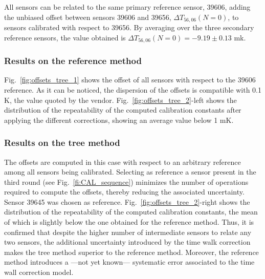 All sensors can be related to the same primary reference sensor, 39606, adding  the unbiased offset between sensors 39606 and 39656,  $\Delta T_{56,06}(N=0)$, to sensors calibrated with respect to 39656. By averaging over the three secondary reference sensors, the value obtained is $\Delta T_{56,06}(N=0)=-9.19\pm0.13$ mk.

\subsubsection{Results on the reference method}
\label{sec:results_reference}
\noindent Fig.~\ref{fig:offsets_tree_1} shows the offset of all sensors with respect to the 39606 reference. As it can be noticed, the dispersion of the offsets is compatible with 0.1 K, the value quoted by the vendor. Fig.~\ref{fig:offsets_tree_2}-left shows the distribution of the repeatability of the computed calibration constants after applying the different corrections, showing an average value below 1 mK.

\subsubsection{Results on the tree method}
\noindent The offsets are computed in this case with respect to an arbitrary reference among all sensors being calibrated. Selecting as reference a sensor present in the third round (see Fig.~\ref{fi:CAL_sequence}) minimizes the number of operations required to compute the offsets, thereby reducing the associated uncertainty. Sensor 39645 was chosen as reference. Fig.~\ref{fig:offsets_tree_2}-right shows the distribution of the repeatability of the computed calibration constants, the mean of which is slightly below the one obtained for the reference method. Thus, it is confirmed that despite the higher number of intermediate sensors to relate any two sensors, the additional uncertainty introduced by the time walk correction makes the tree method superior to the reference method. Moreover, the reference method introduces a ---not yet known--- systematic error associated to the time wall correction model.

